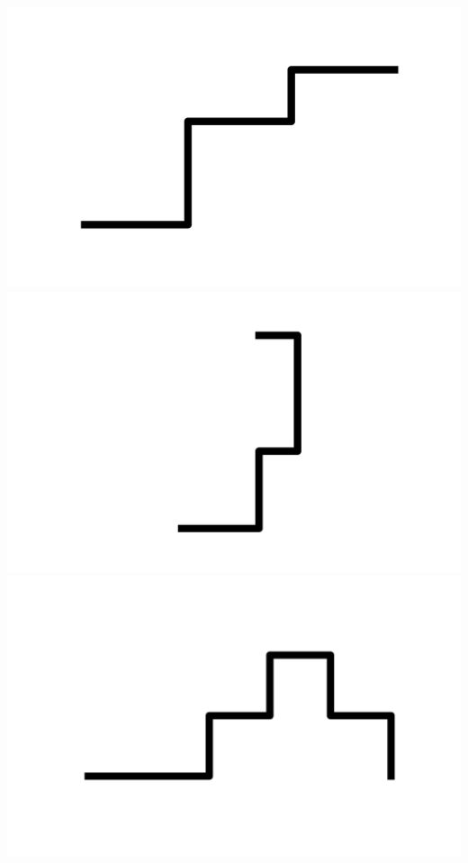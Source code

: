 \documentclass[]{report}
\begin{document}
\includegraphics[scale=.1]{pictures/21/state_cluster_shapes_226.pdf} 
\includegraphics[scale=.1]{pictures/21/state_cluster_shapes_227.pdf} 
\includegraphics[scale=.1]{pictures/21/state_cluster_shapes_228.pdf} 
\end{document}

